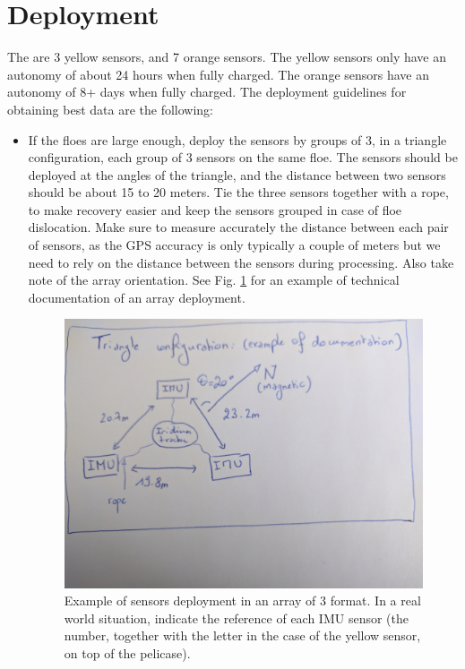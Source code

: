 \documentclass[pdftex,a4paper,12pt,twocolumn,fleqn,captions=tableheading]{scrartcl}
\begin{document}
\section{Deployment}

The are 3 yellow sensors, and 7 orange sensors. The yellow sensors only have an autonomy of about 24 hours when fully charged. The orange sensors have an autonomy of 8+ days when fully charged. The deployment guidelines for obtaining best data are the following:

\begin{itemize}
  \item If the floes are large enough, deploy the sensors by groups of 3, in a triangle configuration, each group of 3 sensors on the same floe. The sensors should be deployed at the angles of the triangle, and the distance between two sensors should be about 15 to 20 meters. Tie the three sensors together with a rope, to make recovery easier and keep the sensors grouped in case of floe dislocation. Make sure to measure accurately the distance between each pair of sensors, as the GPS accuracy is only typically a couple of meters but we need to rely on the distance between the sensors during processing. Also take note of the array orientation. See Fig. \ref{docEx3Sensors} for an example of technical documentation of an array deployment.

  \begin{figure}
  \begin{center}
  \includegraphics[width=.8\textwidth]{Figures/IMG_20170418_134237}
  \caption{\label{docEx3Sensors} Example of sensors deployment in an array of 3 format. In a real world situation, indicate the reference of each IMU sensor (the number, together with the letter in the case of the yellow sensor, on top of the pelicase).}
  \end{center}
  \end{figure}


\end{itemize}
\end{document}
